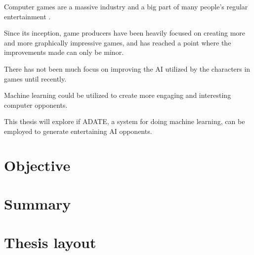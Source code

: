 Computer games are a massive industry  and a big
part of many people's regular entertainment .

Since its inception, game producers have been heavily focused on creating more
and more graphically impressive games, and has reached a point where the
improvements made can only be minor.

There has not been much focus on improving the AI utilized by the characters in
games until recently\cite{tozour2002evolution}.

Machine learning could be utilized to create more engaging and interesting
computer opponents.

This thesis will explore if ADATE, a system for doing machine learning, can be
employed to generate entertaining AI opponents.

\section{Objective}
\label{sec:objective}

\section{Summary}
\label{sec:summary}

\section{Thesis layout}
\label{sec:thesis-layout}




